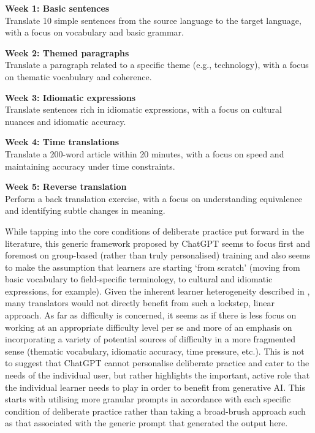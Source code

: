 \documentclass[output=paper]{langscibook}
\begin{document}
\ea
\label{extab:2:2}

\ttfamily\raggedright
\textbf{Week 1: Basic sentences}\\
Translate 10 simple sentences from the source language to the target language, with a focus on vocabulary and basic grammar.

\textbf{Week 2: Themed paragraphs}\\
Translate a paragraph related to a specific theme (e.g., technology), with a focus on thematic vocabulary and coherence.

\textbf{Week 3: Idiomatic expressions}\\
Translate sentences rich in idiomatic expressions, with a focus on cultural nuances and idiomatic accuracy.

\textbf{Week 4: Time translations}\\
Translate a 200-word article within 20 minutes, with a focus on speed and maintaining accuracy under time constraints.

\textbf{Week 5: Reverse translation}\\
Perform a back translation exercise, with a focus on understanding equivalence and identifying subtle changes in meaning.
\z

While tapping into the core conditions of deliberate practice put forward in the literature, this generic framework proposed by ChatGPT seems to focus first and foremost on group-based (rather than truly personalised) training and also seems to make the assumption that learners are starting ‘from scratch’ (moving from basic vocabulary to field-specific terminology, to cultural and idiomatic expressions, for example). Given the inherent learner heterogeneity described in , many translators would not directly benefit from such a lockstep, linear approach. As far as difficulty is concerned, it seems as if there is less focus on working at an appropriate difficulty level per se and more of an emphasis on incorporating a variety of potential sources of difficulty in a more fragmented sense (thematic vocabulary, idiomatic accuracy, time pressure, etc.). This is not to suggest that ChatGPT cannot personalise deliberate practice and cater to the needs of the individual user, but rather highlights the important, active role that the individual learner needs to play in order to benefit from generative AI. This starts with utilising more granular prompts in accordance with each specific condition of deliberate practice rather than taking a broad-brush approach such as that associated with the generic prompt that generated the output here.~
\end{document}

